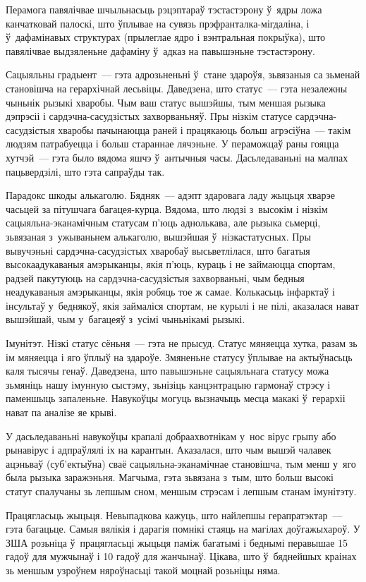 Перамога павялічвае шчыльнасьць рэцэптараў тэстастэрону ў~ядры ложа канчатковай палоскі, што ўплывае на сувязь прэфранталка-мігдаліна, і ў~дафамінавых структурах (прылеглае ядро і вэнтральная покрыўка), што павялічвае выдзяленьне дафаміну ў~адказ на павышэньне тэстастэрону.

Сацыяльны градыент~--- гэта адрозьненьні ў~стане здароўя, зьвязаныя са зьменай становішча на герархічнай лесьвіцы. Даведзена, што статус~--- гэта незалежны чыньнік рызыкі хваробы. Чым ваш статус вышэйшы, тым меншая рызыка дэпрэсіі і сардэчна-сасудзістых захворваньняў. Пры нізкім статусе сардэчна-сасудзістыя хваробы пачынаюцца раней і працякаюць больш агрэсіўна~--- такім людзям патрабуецца і больш стараннае лячэньне. У пераможцаў раны гояцца хутчэй~--- гэта было вядома яшчэ ў~антычныя часы. Дасьледаваньні на малпах пацьвердзілі, што гэта сапраўды так.

Парадокс шкоды алькаголю. Бядняк~--- адэпт здаровага ладу жыцьця хварэе часьцей за пітушчага багацея-курца. Вядома, што людзі з~высокім і нізкім сацыяльна-эканамічным статусам п'юць аднолькава, але рызыка сьмерці, зьвязаная з~ужываньнем алькаголю, вышэйшая ў~нізкастатусных. Пры вывучэньні сардэчна-сасудзістых хваробаў высьветлілася, што багатыя высокаадукаваныя амэрыканцы, якія п'юць, кураць і не займаюцца спортам, радзей пакутуюць на сардэчна-сасудзістыя захворваньні, чым бедныя неадукаваныя амэрыканцы, якія робяць тое ж самае. Колькасьць інфарктаў і інсультаў у~беднякоў, якія займаліся спортам, не курылі і не пілі, аказалася нават вышэйшай, чым у~багацеяў з~усімі чыньнікамі рызыкі.

Імунітэт. Нізкі статус сёньня~--- гэта не прысуд. Статус мяняецца хутка, разам зь ім мяняецца і яго ўплыў на здароўе. Змяненьне статусу ўплывае на актыўнасьць каля тысячы генаў. Даведзена, што павышэньне сацыяльнага статусу можа зьмяніць нашу імунную сыстэму, зьнізіць канцэнтрацыю гармонаў стрэсу і паменшыць запаленьне. Навукоўцы могуць вызначыць месца макакі ў~герархіі нават па аналізе яе крыві.

У дасьледаваньні навукоўцы крапалі добраахвотнікам у~нос вірус грыпу або рынавірус і адпраўлялі іх на карантын. Аказалася, што чым вышэй чалавек ацэньваў (суб'ектыўна) сваё сацыяльна-эканамічнае становішча, тым менш у~яго была рызыка заражэньня. Магчыма, гэта зьвязана з~тым, што больш высокі статут спалучаны зь лепшым сном, меншым стрэсам і лепшым станам імунітэту.

Працягласьць жыцьця. Невыпадкова кажуць, што найлепшы герапратэктар~--- гэта багацьце. Самыя вялікія і дарагія помнікі стаяць на магілах доўгажыхароў. У ЗША розьніца ў~працягласьці жыцьця паміж багатымі і беднымі перавышае 15 гадоў для мужчынаў і 10 гадоў для жанчынаў. Цікава, што ў~бяднейшых краінах зь меншым узроўнем няроўнасьці такой моцнай розьніцы няма.

